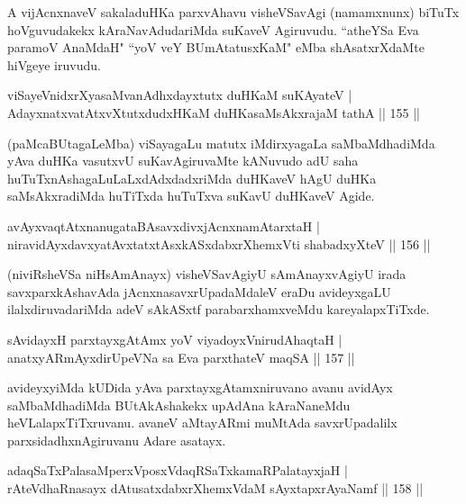 \begin{artha}
A vijAcnxnaveV sakaladuHKa parxvAhavu visheVSavAgi (namamxnunx) biTuTx hoVguvudakekx kAraNavAdudariMda suKaveV Agiruvudu. ``atheYSa Eva paramoV AnaMdaH" ``yoV veY BUmAtatusxKaM" eMba shAsatxrXdaMte hiVgeye iruvudu.
\end{artha}

\begin{shl}
viSayeVnidxrXyasaMvanAdhxdayxtutx duHKaM suKAyateV |\\
AdayxnatxvatAtxvXtutxdudxHKaM \footnotemark[1]{}duHKasaMsAkxrajaM tathA \hfill || 155 ||
\end{shl}

\begin{artha}
(paMcaBUtagaLeMba) viSayagaLu matutx iMdirxyagaLa saMbaMdhadiMda yAva duHKa vasutxvU suKavAgiruvaMte kANuvudo adU saha huTuTxnAshagaLuLaLxdAdxdadxriMda duHKaveV hAgU duHKa saMsAkxradiMda huTiTxda huTuTxva suKavU duHKaveV Agide.
\end{artha}

\begin{shl}
avAyxvaqtAtxnanugataBAsavxdivxjAcnxnamAtarxtaH |\\
niravidAyxdavxyatAvxtatxtAsxkASxdabxrXhemxVti shabadxyXteV \hfill || 156 ||
\end{shl}

\begin{artha}%
(niviRsheVSa niHsAmAnayx) visheVSavAgiyU sAmAnayxvAgiyU irada savxparxkAshavAda jAcnxnasavxrUpadaMdaleV eraDu avideyxgaLU ilalxdiruvadariMda adeV sAkASxtf parabarxhamxveMdu kareyalapxTiTxde.
\end{artha}

\begin{shl}
sAvidayxH parxtayxgAtAmx yoV viyadoyxVnirudAhaqtaH |\\
anatxyARmAyxdirUpeVNa sa Eva parxthateV maqSA \hfill || 157 ||
\end{shl}

\begin{artha}
avideyxyiMda kUDida yAva parxtayxgAtamxniruvano avanu avidAyx saMbaMdhadiMda BUtAkAshakekx upAdAna kAraNaneMdu heVLalapxTiTxruvanu. avaneV aMtayARmi muMtAda savxrUpadalilx parxsidadhxnAgiruvanu Adare asatayx.
\end{artha}

\begin{shl}
adaqSaTxPalasaMperxVposxVdaqRSaTxkamaRPalatayxjaH |\\
\footnotemark[1]{}rAteVdhaRnasayx dAtusatxdabxrXhemxVdaM sAyxtapxrAyaNamf \hfill || 158 ||
\end{shl}


